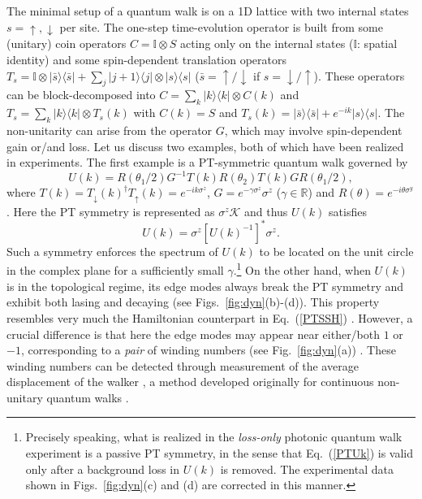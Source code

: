 \documentclass{tADP2e}
\theoremstyle{plain}
\theoremstyle{plain}
\theoremstyle{definition}
\begin{document}
The minimal setup of a quantum walk is on a 1D lattice with two internal states $s=\uparrow,\downarrow$ per site. The one-step time-evolution operator is built from some (unitary) coin operators $C=\mathbb{I}\otimes S$ acting only on the internal states ($\mathbb{I}$: spatial identity) and some spin-dependent translation operators $T_s=\mathbb{I}\otimes| \bar s\rangle\langle \bar s|+\sum_j|j+1\rangle\langle j|\otimes|s\rangle\langle s|$ ($\bar s= \uparrow/\downarrow$ if $s=\downarrow/\uparrow$). These operators can be block-decomposed into $C=\sum_k |k\rangle\langle k|\otimes C(k)$ and $T_s=\sum_k |k\rangle\langle k|\otimes T_s(k)$ with
$C(k)=S$ and %
$T_s(k)=| \bar s\rangle\langle \bar s|+e^{-ik}|s\rangle\langle s|$.
The non-unitarity can arise from the operator $G$, which may involve spin-dependent gain or/and loss. Let us discuss two examples, both of which have been realized in experiments. The first example is a PT-symmetric quantum walk governed by \cite{DK16,LX17}
\begin{equation}
U(k)=R(\theta_1/2) G^{-1}T(k)R(\theta_2)T(k)G R(\theta_1/2),%
\label{UPT}
\end{equation}
where $T(k)=T_\downarrow(k)^\dag T_\uparrow(k)=e^{-ik\sigma^z}$, %
$G=e^{-\gamma\sigma^z}\sigma^z$ ($\gamma\in\mathbb{R}$) and $R(\theta)=e^{-i\theta\sigma^y}$. Here the PT symmetry is represented as $\sigma^z\mathcal{K}$ and thus $U(k)$ satisfies
\begin{equation}
U(k)=\sigma^z[U(k)^{-1}]^*\sigma^z.
\label{PTUk}
\end{equation}
Such a symmetry enforces the spectrum of $U(k)$ to be located on the unit circle in the complex plane for a sufficiently small $\gamma$.\footnote{Precisely speaking, what is realized in the \emph{loss-only} photonic quantum walk experiment \cite{LX17} is a passive PT symmetry, in the sense that Eq.~(\ref{PTUk}) is valid only after a background loss in $U(k)$ is removed. The experimental data  shown in Figs.~\ref{fig:dyn}(c) and (d) are corrected in this manner.} On the other hand, when $U(k)$ is in the topological regime, its edge modes always break the PT symmetry and exhibit both lasing and decaying (see Figs.~\ref{fig:dyn}(b)-(d)). This property resembles very much the Hamiltonian counterpart in Eq.~(\ref{PTSSH}) \cite{WS17}. However, a crucial difference is that here the edge modes may appear near either/both $1$ or $-1$, corresponding to a \emph{pair} of winding numbers (see Fig.~\ref{fig:dyn}(a)) \cite{DK16}. These winding numbers can be detected through measurement of the average displacement of the walker \cite{ZX17}, a method developed originally for continuous non-unitary quantum walks \cite{RMS09,ZJM15}. 
\end{document}
